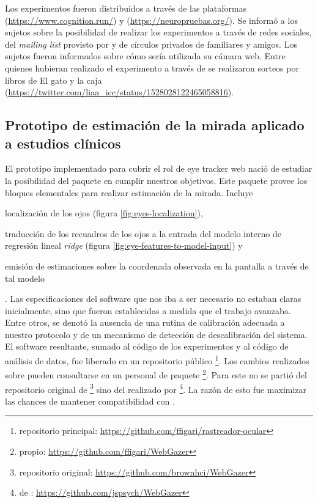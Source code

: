   Los experimentos fueron distribuidos a través de las plataformas \cognition
  (\url{https://www.cognition.run/}) y \neuropruebas
  (\url{https://neuropruebas.org/}).
  Se informó a los sujetos sobre la posibilidad de realizar los experimentos a
  través de redes sociales, del \textit{mailing list} provisto por \neuropruebas
  y de círculos privados de familiares y amigos.
  Los sujetos fueron informados sobre cómo sería utilizada su cámara web.
  Entre quienes hubieran realizado el experimento a través de \neuropruebas se 
  realizaron sorteos por libros de El gato y la caja
  (\url{https://twitter.com/liaa_icc/status/1528028122465058816}).

\subsection{Prototipo de estimación de la mirada aplicado a estudios clínicos}

  El prototipo implementado para cubrir el rol de eye tracker web nació de
  estudiar la posibilidad del paquete \webgazer en cumplir nuestros objetivos.
  Este paquete provee los bloques elementales para realizar estimación de la
  mirada.
  Incluye \begin{enumerate*}
    \item localización de los ojos (figura \ref{fig:eyes-localization}),
    \item traducción de los recuadros de los ojos a la entrada del modelo
      interno de regresión lineal \textit{ridge} (figura
      \ref{fig:eye-features-to-model-input}) y
    \item emisión de estimaciones sobre la coordenada observada en la pantalla
      a través de tal modelo
  \end{enumerate*}.
  Las especificaciones del software que nos iba a ser necesario no estaban
  claras inicialmente, sino que fueron establecidas a medida que el trabajo
  avanzaba.
  Entre otros, se denotó la ausencia de una rutina de calibración adecuada a
  nuestro protocolo y de un mecanismo de detección de descalibración del
  sistema.
  El software resultante, sumado al código de los experimentos y al código de
  análisis de datos, fue liberado en un repositorio público \footnote{
    repositorio principal:
    \url{https://github.com/ffigari/rastreador-ocular}
  }.
  Los cambios realizados sobre \webgazer pueden consultarse en un \fork
  personal de paquete \footnote{
    \fork propio:
    \url{https://github.com/ffigari/WebGazer}
  }.
  Para este \fork no se partió del repositorio original de \webgazer \footnote{
    repositorio original:
    \url{https://github.com/brownhci/WebGazer}
  } sino del \fork realizado por \jspsych \footnote{
    \fork de \jspsych:
    \url{https://github.com/jspsych/WebGazer}
  }.
  La razón de esto fue maximizar las chances de mantener compatibilidad con
  \jspsych.

